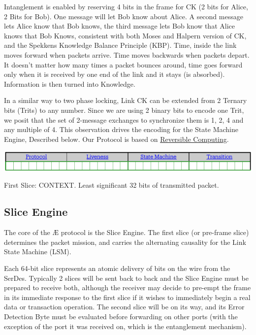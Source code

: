 \documentclass[../../../OAE-SPEC-MAIN.tex]{subfiles}
\begin{document}
Intanglement is enabled by reserving 4 bits in the frame for CK (2 bits for Alice, 2 Bits for Bob). One message will let Bob know about Alice.  A second message lets Alice know that Bob knows, the third message lets Bob know that Alice knows that Bob Knows, consistent with both Moses and Halpern version of CK, and the Spekkens Knowledge Balance Principle (KBP).
Time, inside the link moves forward when packets arrive. Time moves backwards when packets depart. It doesn’t matter how many times a packet bounces around, time goes forward only when it is received by one end of the link and it stays (is absorbed). Information is then turned into Knowledge. 

In a similar way to two phase locking, Link CK can be extended from 2 Ternary bits (Trits) to any number. Since we are using 2 binary bits to encode one Trit, we posit that the set of 2-message exchanges to synchronize them is 1, 2, 4 and any multiple of 4. This observation drives the encoding for the State Machine Engine, Described below.
Our Protocol is based on \href{https://wiki.xxiivv.com/site/reversible_computing.html}{Reversible Computing}. 

 \begin{marginfigure}
 \centering
  \includegraphics[width=1.1\linewidth]{./figures/First-Slice-Encodings.pdf}
\caption{\centering First Slice: CONTEXT. Least significant 32 bits of  transmitted packet.}
\end{marginfigure}

\subsection{Slice Engine}
The core of the Æ protocol is the Slice Engine. The first slice (or pre-frame slice) determines the packet mission, and carries the alternating causality for the Link State Machine (LSM).

Each 64-bit slice represents an atomic delivery of bits on the wire from the SerDes. Typically 2 slices will be sent back to back and the Slice Engine must be prepared to receive both, although the receiver may decide to pre-empt the frame in its immediate response to the first slice if it wishes to immediately begin a real data or transaction operation. The second slice will be on its way, and its Error Detection Byte must be evaluated before forwarding on other ports (with the exception of the port it was received on, which is the entanglement mechanism).
\end{document}
